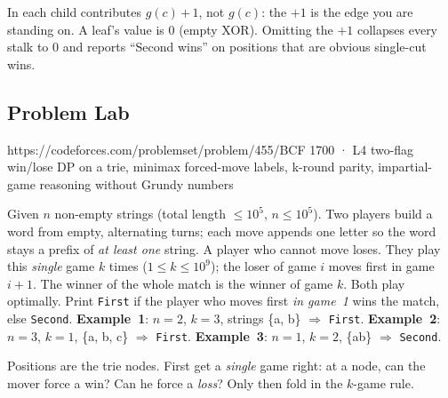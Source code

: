 \begin{warningbox}
In  each child contributes $g(c) \,\mathbf{+}\, 1$, not $g(c)$: the
$+1$ is the edge you are standing on. A leaf's value is $0$ (empty XOR). Omitting the $+1$
collapses every stalk to $0$ and reports ``Second wins'' on positions that are obvious
single-cut wins.
\end{warningbox}

\subsection{Problem Lab}

  {https://codeforces.com/problemset/problem/455/B}{CF 1700 · L4}
  {two-flag win/lose DP on a trie, minimax forced-move labels, k-round parity,
   impartial-game reasoning without Grundy numbers}

\begin{problemstatement}
Given $n$ non-empty strings (total length $\le 10^5$, $n \le 10^5$). Two players build a
word from empty, alternating turns; each move appends one letter so the word stays a
prefix of \emph{at least one} string. A player who cannot move loses. They play this
\emph{single} game $k$ times ($1 \le k \le 10^9$); the loser of game $i$ moves first in
game $i+1$. The winner of the whole match is the winner of game $k$. Both play
optimally. Print \texttt{First} if the player who moves first \emph{in game~1} wins the
match, else \texttt{Second}. \textbf{Example~1}: $n=2$, $k=3$, strings \{a, b\} $\Rightarrow$
\texttt{First}. \textbf{Example~2}: $n=3$, $k=1$, \{a, b, c\} $\Rightarrow$ \texttt{First}.
\textbf{Example~3}: $n=1$, $k=2$, \{ab\} $\Rightarrow$ \texttt{Second}.
\end{problemstatement}

\begin{attemptgate}
Positions are the trie nodes. First get a \emph{single} game right: at a node, can the
mover force a win? Can he force a \emph{loss}? Only then fold in the $k$-game rule.
\end{attemptgate}

